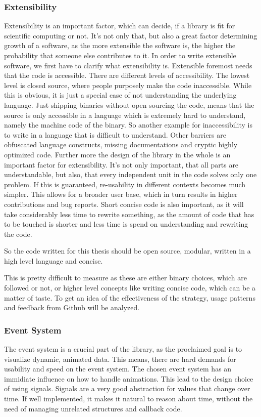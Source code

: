 \subsubsection{Extensibility}
Extensibility is an important factor, which can decide, if a library is fit for scientific computing or not. 
It's not only that, but also a great factor determining growth of a software, as the more extensible the software is, the higher the probability that someone else contributes to it.
In order to write extensible software, we first have to clarify what extensibility is.
Extensible foremost needs that the code is accessible. There are different levels of accessibility. The lowest level is closed source, where people purposely make the code inaccessible. While this is obvious, it is just a special case of not understanding the underlying language. Just shipping binaries without open sourcing the code, means that the source is only accessible in a language which is extremely hard to understand, namely the machine code of the binary. So another example for inaccessibility is to write in a language that is difficult to understand. Other barriers are obfuscated language constructs, missing documentations and cryptic highly optimized code.
Further more the design of the library in the whole is an important factor for extensibility. It's not only important, that all parts are understandable, but also, that every independent unit in the code solves only one problem.
If this is guaranteed, re-usability in different contexts becomes much simpler. This allows for a broader user base, which in turn results in higher contributions and bug reports.
Short concise code is also important, as it will take considerably less time to rewrite something, as the amount of code that has to be touched is shorter and less time is spend on understanding and rewriting the code.

So the code written for this thesis should be open source, modular, written in a high level language and concise.

This is pretty difficult to measure as these are either binary choices, which are followed or not, 
or higher level concepts like writing concise code, which can be a matter of taste.
To get an idea of the effectiveness of the strategy, usage patterns and feedback from Github will be analyzed.

\subsubsection{Event System}
The event system is a crucial part of the library, as the proclaimed goal is to visualize dynamic, animated data.
This means, there are hard demands for usability and speed on the event system.
The chosen event system has an immidiate influence on how to handle animations. 
This lead to the design choice of using signals. Signals are a very good abstraction for values that change over time.
If well implemented, it makes it natural to reason about time, without the need of managing unrelated structures and callback code.

